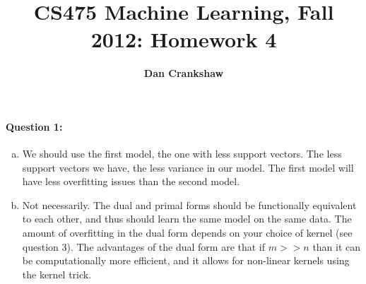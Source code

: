 \documentclass[letterpaper,11pt]{article}
\title{CS475 Machine Learning, Fall 2012: Homework 4}
\date{}
\author{\bf Dan Crankshaw}
\begin{document}
\maketitle


\paragraph{Question 1:}
\begin{enumerate}[(a)]
\item
We should use the first model, the one with less support vectors. The less
support vectors we have, the less variance in our model. The first model
will have less overfitting issues than the second model.
\item Not necessarily. The dual and primal forms should be functionally equivalent to each other, and thus should learn the same model on the same data. The amount of overfitting in the dual form depends on your choice of
kernel (see question 3). The advantages of the dual form are that if 
$m >> n$ than it can be computationally more efficient, and it allows for
non-linear kernels using the kernel trick.
\end{enumerate}
\end{document}
